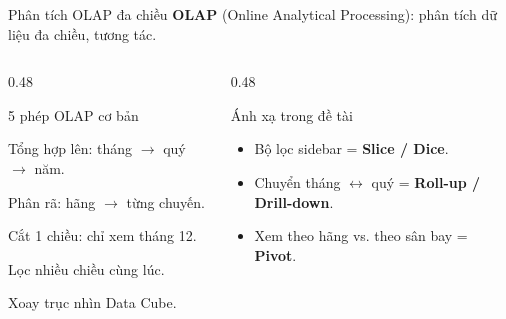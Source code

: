 \begin{frame}{Phân tích OLAP đa chiều}
\textbf{OLAP} (Online Analytical Processing): phân tích dữ liệu đa chiều, tương tác.

\vspace{2mm}
\begin{columns}[T,onlytextwidth]
\begin{column}{0.48\textwidth}
\begin{block}{5 phép OLAP cơ bản}
\begin{description}
  \item[\textbf{Roll-up}] Tổng hợp lên: tháng $\to$ quý $\to$ năm.
  \item[\textbf{Drill-down}] Phân rã: hãng $\to$ từng chuyến.
  \item[\textbf{Slice}] Cắt 1 chiều: chỉ xem tháng 12.
  \item[\textbf{Dice}] Lọc nhiều chiều cùng lúc.
  \item[\textbf{Pivot}] Xoay trục nhìn Data Cube.
\end{description}
\end{block}
\end{column}
\begin{column}{0.48\textwidth}
\begin{block}{Ánh xạ trong đề tài}
\begin{itemize}
  \item Bộ lọc sidebar = \textbf{Slice / Dice}.
  \item Chuyển tháng $\leftrightarrow$ quý = \textbf{Roll-up / Drill-down}.
  \item Xem theo hãng vs. theo sân bay = \textbf{Pivot}.
\end{itemize}
\end{block}
\end{column}
\end{columns}
\end{frame}


